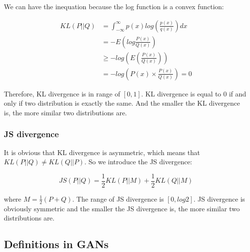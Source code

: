 \documentclass{article} %
\begin{document}
We can have the inequation because the log function is a convex function: 

\begin{equation}
    \begin{split}
        KL(P||Q) & = \int_{-\infty}^{\infty}p(x)log(\frac{p(x)}{q(x)})dx \\
                 & = -E(log\frac{P(x)}{Q(x)}) \\
                 & \geq -log(E(\frac{P(x)}{Q(x)})) \\
                 & = -log(P(x) \times \frac{P(x)}{Q(x)}) = 0
    \end{split}
\end{equation}

Therefore, KL divergence is in range of $[0, 1]$. KL divergence is equal to $0$ if and only if two distribution is exactly the same. And the smaller the KL divergence is, the more similar two distributions are.

\subsubsection{JS divergence}

It is obvious that KL divergence is asymmetric, which means that $KL(P||Q) \neq KL(Q||P)$. So we introduce the JS divergence:

\begin{equation}
    JS(P||Q) = \frac{1}{2}KL(P||M) + \frac{1}{2}KL(Q||M)
\end{equation}

where $M = \frac{1}{2}(P + Q)$. The range of JS divergence is $[0, log2]$. JS divergence is obviously symmetric and the smaller the JS divergence is, the more similar two distributions are.

\subsection{Definitions in GANs}
\end{document}
